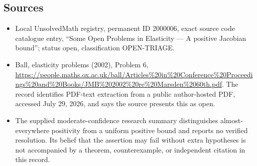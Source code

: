 \documentclass[11pt]{article}
\begin{document}
\subsection{Sources}
\begin{itemize}
\item Local UnsolvedMath registry, permanent ID 2000006, exact source code catalogue entry, ``Some Open Problems in Elasticity --- A positive Jacobian bound''; status open, classification OPEN-TRIAGE.
\item Ball, elasticity problems (2002), Problem 6, \url{https://people.maths.ox.ac.uk/ball/Articles%20in%20Conference%20Proceedings%20and%20Books/JMB%202002%20re%20Marsden%2060th.pdf}. The record identifies PDF-text extraction from a public author-hosted PDF, accessed July 29, 2026, and says the source presents this as open.
\item The supplied moderate-confidence research summary distinguishes almost-everywhere positivity from a uniform positive bound and reports no verified resolution. Its belief that the assertion may fail without extra hypotheses is not accompanied by a theorem, counterexample, or independent citation in this record.
\end{itemize}
\end{document}
